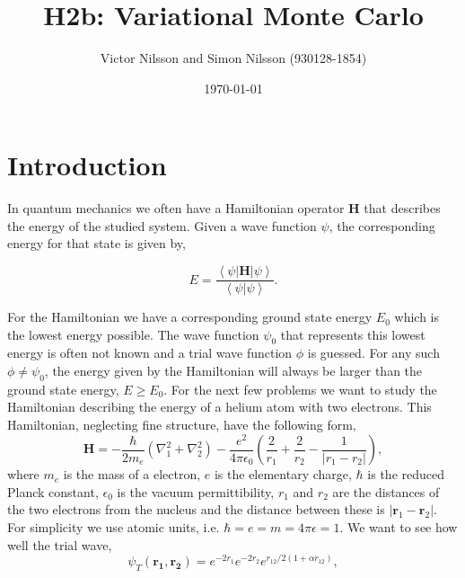 



\title{H2b: Variational Monte Carlo}
\author{Victor Nilsson and Simon Nilsson (930128-1854)}
\date{\today}





\section*{Introduction}

In quantum mechanics we often have a Hamiltonian operator $\mathbf{H}$ that describes the energy of the studied system. Given a wave function $\psi$, the corresponding energy for that state is given by,

\begin{equation}
E=\frac{\left<\psi|\mathbf{H}|\psi\right>}{\left<\psi|\psi\right>}.
\end{equation}

For the Hamiltonian we have a corresponding ground state energy $E_0$ which is the lowest energy possible. The wave function $\psi_0$ that represents this lowest energy is often not known and a trial wave function $\phi$ is guessed. For any such $\phi \neq \psi_0$, the energy given by the Hamiltonian will always be larger than the ground state energy, $E \geq E_0$. For the next few problems we want to study the Hamiltonian describing the energy of a helium atom with two electrons. This Hamiltonian, neglecting fine structure, have the following form,
\begin{equation}
\mathbf{H}=-\frac{\hbar}{2m_e}\left(\nabla_1^2+\nabla_2^2\right)-\frac{e^2}{4\pi \epsilon_0}\left(\frac{2}{r_1}+\frac{2}{r_2}-\frac{1}{|r_1-r_2|}\right),
\end{equation} 
where $m_e$ is the mass of a electron, $e$ is the elementary charge, $\hbar$ is the reduced Planck constant, $\epsilon_0$ is the vacuum permittibility, $r_1$ and $r_2$ are the distances of the two electrons from the nucleus and the distance between these is $|\mathbf{r}_1-\mathbf{r}_2|$. For simplicity we use atomic units, i.e. $\hbar=e=m=4\pi\epsilon=1$. We want to see how well the trial wave,
\begin{equation}
\psi_T(\mathbf{r_1},\mathbf{r_2})=e^{-2r_1}e^{-2r_2}e^{r_{12}/2(1+\alpha r_{12})},
\end{equation}


